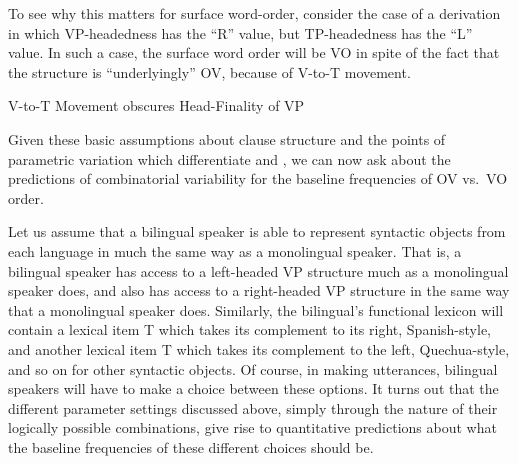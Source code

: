 \documentclass[output=paper]{langsci/langscibook}
\begin{document}
To see why this matters for surface word-order, consider the case of a
derivation in which VP-headedness has the  \enquote{R} value, but TP-headedness
has the  \enquote{L} value.  In such a case, the surface word order will be VO
in spite of the fact that the structure is “underlyingly” OV, because of V-to-T
movement.

\ea {}V-to-T Movement obscures Head-Finality of VP\\
\z

Given these basic assumptions about clause structure and the points of
parametric variation which differentiate  and , we can now ask
about the predictions of combinatorial variability for the baseline frequencies
of OV vs.\ VO order.

Let us assume that a bilingual speaker is able to represent syntactic objects
from each language in much the same way as a monolingual speaker.  That is, a
bilingual speaker has access to a left-headed VP structure much as a
monolingual  speaker does, and also has access to a right-headed VP
structure in the same way that a monolingual  speaker does.  Similarly,
the bilingual’s functional lexicon will contain a lexical item T which takes
its complement to its right, Spanish-style, and another lexical item T which
takes its complement to the left, Quechua-style, and so on for other syntactic
objects.  Of course, in making utterances, bilingual speakers will have to make
a choice between these options.  It turns out that the different parameter
settings discussed above, simply through the nature of their logically possible
combinations, give rise to quantitative predictions about what the baseline
frequencies of these different choices should be.
\end{document}
